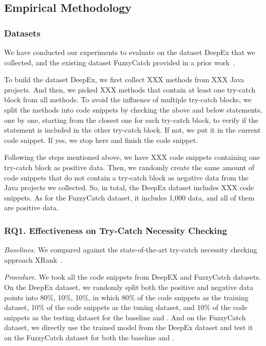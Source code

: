 \subsection{Empirical Methodology}

\subsubsection{Datasets}


We have conducted our experiments to evaluate {\tool} on the dataset DeepEx that we collected, and the existing dataset FuzzyCatch provided in a prior work~\cite{nguyen2020code}. 

To build the dataset DeepEx, we first collect XXX methods from XXX Java projects. And then, we picked XXX methods that contain at least one try-catch block from all methods. To avoid the influence of multiple try-catch blocks, we split the methods into code snippets by checking the above and below statements, one by one, starting from the closest one for each try-catch block, to verify if the statement is included in the other try-catch block. If not, we put it in the current code snippet. If yes, we stop here and finish the code snippet.

Following the steps mentioned above, we have XXX code snippets containing one try-catch block as positive data. Then, we randomly create the same amount of code snippets that do not contain a try-catch block as negative data from the Java projects we collected. So, in total, the DeepEx dataset includes XXX code snippets. As for the FuzzyCatch dataset, it includes 1,000 data, and all of them are positive data.


\subsubsection{RQ1. Effectiveness on Try-Catch Necessity Checking}

{\em Baselines.} We compared {\tool} against the state-of-the-art try-catch necessity checking approach XRank~\cite{nguyen2020code}.

{\em Procedure.} We took all the code snippets from DeepEX and FuzzyCatch datasets. On the DeepEx dataset, we randomly split both the positive and negative data points into 80\%, 10\%, 10\%, in which 80\% of the code snippets as the training dataset, 10\% of the code snippets as the tuning dataset, and 10\% of the code snippets as the testing dataset for the baseline and {\tool}. And on the FuzzyCatch dataset, we directly use the trained model from the DeepEx dataset and test it on the FuzzyCatch dataset for both the baseline and {\tool}.

